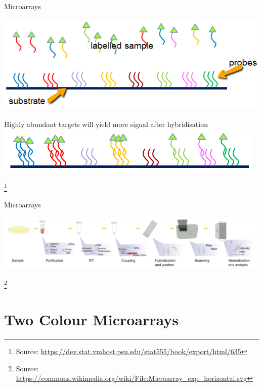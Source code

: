 \documentclass[aspectratio=169,11pt]{beamer}
\newcommand\blfootnote[1]{%
  \begingroup
  \renewcommand\thefootnote{}\footnote{#1}%
  \addtocounter{footnote}{-1}%
  \endgroup
}
\begin{document}
\begin{frame}{Microarrays}

	\begin{center}
		\includegraphics[scale=0.5]{figures/microarray_diagram.png} 
		~\\[8mm]
		\pause
		Highly abundant targets will yield more signal after hybridisation\\[2mm]
		\includegraphics[scale=0.5]{figures/microarray_diagram_02.png} 
	\end{center}
	
	\blfootnote{Source: \url{https://dev.stat.vmhost.psu.edu/stat555/book/export/html/635}}	

\end{frame}

\begin{frame}{Microarrays}

	\begin{center}
	\includegraphics[scale=0.4]{figures/Microarrayhorizontal.png} 
	\end{center}
	
	\blfootnote{Source: \url{https://commons.wikimedia.org/wiki/File:Microarray\_exp\_horizontal.svg}}

\end{frame}

\section{Two Colour Microarrays}
\end{document}

